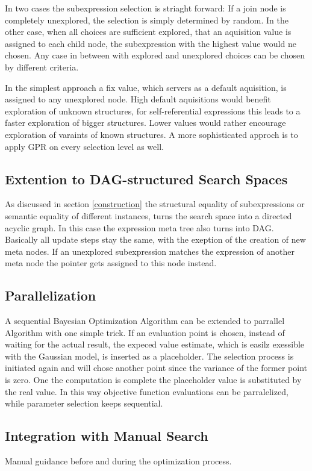 \documentclass[english]{article}
\begin{document}
In two cases the subexpression selection is striaght forward: If a join node is completely unexplored, the selection is simply determined by random. In the other case, when all choices are sufficient explored, that an aquisition value is assigned to each child node, the subexpression with the highest value would ne chosen. Any case in between with explored and unexplored choices can be chosen by different criteria.

In the simplest approach a fix value, which servers as a default aquisition, is assigned to any unexplored node. High default aquisitions would benefit exploration of unknown structures, for self-referential expressions this leads to a faster exploration of bigger structures. Lower values would rather encourage exploration of varaints of known structures.
A more sophisticated approch is to apply \ac{GPR} on every selection level as well.

\subsection{Extention to DAG-structured Search Spaces}
As discussed in section \ref{construction} the structural equality of subexpressions or semantic equality of different instances, turns the search space into a directed acyclic graph. In this case the expression meta tree also turns into DAG. Basically all update steps stay the same, with the exeption of the creation of new meta nodes. If an unexplored subexpression matches the expression of another meta node the pointer gets assigned to this node instead.

\subsection{Parallelization}
A sequential Bayesian Optimization Algorithm can be extended to parrallel Algorithm with one simple trick. If an evaluation point is chosen, instead of waiting for the actual result, the expeced value estimate, which is easilz exessible with the Gaussian model, is inserted as a placeholder. The selection process is initiated again and will chose another point since the variance of the former point is zero. One the computation is complete the placeholder value is substituted by the real value. In this way objective function evaluations can be parralelized, while parameter selection keeps sequential.

\subsection{Integration with Manual Search}
Manual guidance before and during the optimization process.
\end{document}
